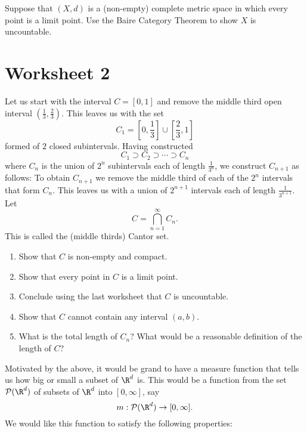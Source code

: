 \documentclass[12pt]{amsart}
\theoremstyle{definition}
\theoremstyle{remark}
\renewcommand{\bold}[1]{\medskip \noindent {\bf #1 }\nopagebreak}
\begin{document}
\bold{Problem C:} Suppose that $(X,d)$ is a (non-empty) complete metric space in which every point is a limit point. Use the Baire Category Theorem to show $X$ is uncountable. 

\newpage
\section{Worksheet 2}

\bold{Problem A:} Let us start with the interval $C=[0,1]$ and remove the middle third open interval $(\frac 13, \frac23)$. This leaves us with the set 
$$C_1=\left[0, \frac13\right]\cup \left[\frac23, 1\right]$$ formed of $2$ closed subintervals. Having constructed $$C_1\supset C_2\supset \cdots \supset C_n$$ where $C_n$ is the union of $2^n$ subintervals each of length $\frac{1}{3^n}$, we construct $C_{n+1}$ as follows: To obtain $C_{n+1}$ we remove the middle third of each of the $2^n$ intervals that form $C_n$. This leaves us with a union of $2^{n+1}$ intervals each of length $\frac{1}{3^{n+1}}$. Let $$C=\bigcap_{n=1}^{\infty} C_n.$$ This is called the (middle thirds) Cantor set. 

\begin{enumerate}

\item Show that $C$ is non-empty and compact.

\item Show that every point in $C$ is a limit point.  

\item Conclude using the last worksheet that $C$ is uncountable.

\item  Show that $C$ cannot contain any interval $(a, b)$. 

\item What is the total length of $C_n$? What would be a reasonable definition of the length of $C$?

\end{enumerate}


\bold{Problem B:} Motivated by the above, it would be grand to have a measure function that tells us how big or small a subset of $\R^d$ is. This would be a function from the set $\mathcal P(\R^d)$ of subsets of $\R^d$ into $[0, \infty]$, say $$m: \mathcal P(\R^d)\to [0,\infty].$$ We would like this function to satisfy the following properties: 
\end{document}
